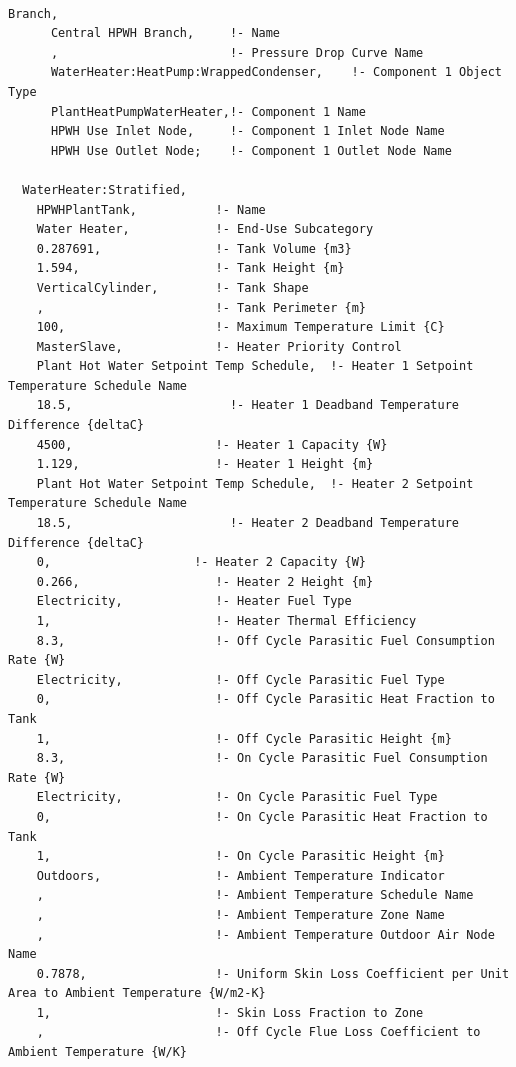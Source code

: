 \begin{lstlisting}

Branch,
      Central HPWH Branch,     !- Name
      ,                        !- Pressure Drop Curve Name
      WaterHeater:HeatPump:WrappedCondenser,    !- Component 1 Object Type
      PlantHeatPumpWaterHeater,!- Component 1 Name
      HPWH Use Inlet Node,     !- Component 1 Inlet Node Name
      HPWH Use Outlet Node;    !- Component 1 Outlet Node Name

  WaterHeater:Stratified,
    HPWHPlantTank,           !- Name
    Water Heater,            !- End-Use Subcategory
    0.287691,                !- Tank Volume {m3}
    1.594,                   !- Tank Height {m}
    VerticalCylinder,        !- Tank Shape
    ,                        !- Tank Perimeter {m}
    100,                     !- Maximum Temperature Limit {C}
    MasterSlave,             !- Heater Priority Control
    Plant Hot Water Setpoint Temp Schedule,  !- Heater 1 Setpoint Temperature Schedule Name
    18.5,                      !- Heater 1 Deadband Temperature Difference {deltaC}
    4500,                    !- Heater 1 Capacity {W}
    1.129,                   !- Heater 1 Height {m}
    Plant Hot Water Setpoint Temp Schedule,  !- Heater 2 Setpoint Temperature Schedule Name
    18.5,                      !- Heater 2 Deadband Temperature Difference {deltaC}
    0,                    !- Heater 2 Capacity {W}
    0.266,                   !- Heater 2 Height {m}
    Electricity,             !- Heater Fuel Type
    1,                       !- Heater Thermal Efficiency
    8.3,                     !- Off Cycle Parasitic Fuel Consumption Rate {W}
    Electricity,             !- Off Cycle Parasitic Fuel Type
    0,                       !- Off Cycle Parasitic Heat Fraction to Tank
    1,                       !- Off Cycle Parasitic Height {m}
    8.3,                     !- On Cycle Parasitic Fuel Consumption Rate {W}
    Electricity,             !- On Cycle Parasitic Fuel Type
    0,                       !- On Cycle Parasitic Heat Fraction to Tank
    1,                       !- On Cycle Parasitic Height {m}
    Outdoors,                !- Ambient Temperature Indicator
    ,                        !- Ambient Temperature Schedule Name
    ,                        !- Ambient Temperature Zone Name
    ,                        !- Ambient Temperature Outdoor Air Node Name
    0.7878,                  !- Uniform Skin Loss Coefficient per Unit Area to Ambient Temperature {W/m2-K}
    1,                       !- Skin Loss Fraction to Zone
    ,                        !- Off Cycle Flue Loss Coefficient to Ambient Temperature {W/K}

\end{lstlisting}
